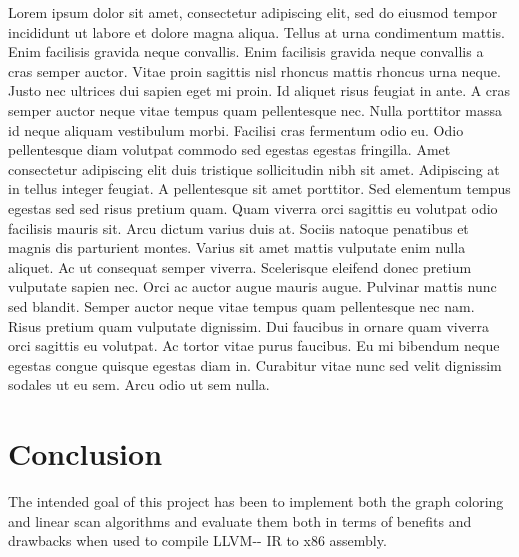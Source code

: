 \documentclass{article}
\begin{document}
Lorem ipsum dolor sit amet, consectetur adipiscing elit, sed do eiusmod tempor incididunt ut labore et dolore magna aliqua. Tellus at urna condimentum mattis. Enim facilisis gravida neque convallis. Enim facilisis gravida neque convallis a cras semper auctor. Vitae proin sagittis nisl rhoncus mattis rhoncus urna neque. Justo nec ultrices dui sapien eget mi proin. Id aliquet risus feugiat in ante. A cras semper auctor neque vitae tempus quam pellentesque nec. Nulla porttitor massa id neque aliquam vestibulum morbi. Facilisi cras fermentum odio eu. Odio pellentesque diam volutpat commodo sed egestas egestas fringilla. Amet consectetur adipiscing elit duis tristique sollicitudin nibh sit amet. Adipiscing at in tellus integer feugiat. A pellentesque sit amet porttitor. Sed elementum tempus egestas sed sed risus pretium quam. Quam viverra orci sagittis eu volutpat odio facilisis mauris sit. Arcu dictum varius duis at. Sociis natoque penatibus et magnis dis parturient montes. Varius sit amet mattis vulputate enim nulla aliquet. Ac ut consequat semper viverra. Scelerisque eleifend donec pretium vulputate sapien nec. Orci ac auctor augue mauris augue. Pulvinar mattis nunc sed blandit. Semper auctor neque vitae tempus quam pellentesque nec nam. Risus pretium quam vulputate dignissim. Dui faucibus in ornare quam viverra orci sagittis eu volutpat. Ac tortor vitae purus faucibus. Eu mi bibendum neque egestas congue quisque egestas diam in. Curabitur vitae nunc sed velit dignissim sodales ut eu sem. Arcu odio ut sem nulla.


\section{Conclusion}

The intended goal of this project has been to implement both the graph coloring and linear scan algorithms and evaluate them both in terms of benefits and drawbacks when used to compile LLVM-{}- IR to x86 assembly.
\end{document}

